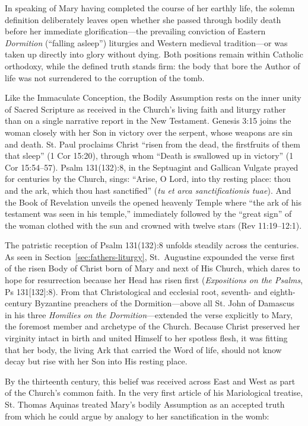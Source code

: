 In speaking of Mary having completed the course of her earthly life, the solemn definition deliberately leaves open whether she passed through bodily death before her immediate glorification---the prevailing conviction of Eastern \textit{Dormition} (``falling asleep'') liturgies and Western medieval tradition---or was taken up directly into glory without dying. Both positions remain within Catholic orthodoxy, while the defined truth stands firm: the body that bore the Author of life was not surrendered to the corruption of the tomb.

Like the Immaculate Conception, the Bodily Assumption rests on the inner unity of Sacred Scripture as received in the Church's living faith and liturgy rather than on a single narrative report in the New Testament. Genesis 3:15 joins the woman closely with her Son in victory over the serpent, whose weapons are sin and death. St. Paul proclaims Christ ``risen from the dead, the firstfruits of them that sleep'' (1 Cor 15:20), through whom ``Death is swallowed up in victory'' (1 Cor 15:54--57). Psalm 131(132):8, in the Septuagint and Gallican Vulgate prayed for centuries by the Church, sings: ``Arise, O Lord, into thy resting place: thou and the ark, which thou hast sanctified'' (\textit{tu et arca sanctificationis tuae}). And the Book of Revelation unveils the opened heavenly Temple where ``the ark of his testament was seen in his temple,'' immediately followed by the ``great sign'' of the woman clothed with the sun and crowned with twelve stars (Rev 11:19--12:1).

The patristic reception of Psalm 131(132):8 unfolds steadily across the centuries. As seen in Section~\ref{sec:fathers-liturgy}, St.\ Augustine expounded the verse first of the risen Body of Christ born of Mary and next of His Church, which dares to hope for resurrection because her Head has risen first (\textit{Expositions on the Psalms}, Ps 131[132]:8). From that Christological and ecclesial root, seventh- and eighth-century Byzantine preachers of the Dormition---above all St. John of Damascus in his three \textit{Homilies on the Dormition}---extended the verse explicitly to Mary, the foremost member and archetype of the Church. Because Christ preserved her virginity intact in birth and united Himself to her spotless flesh, it was fitting that her body, the living Ark that carried the Word of life, should not know decay but rise with her Son into His resting place.

By the thirteenth century, this belief was received across East and West as part of the Church's common faith. In the very first article of his Mariological treatise, St. Thomas Aquinas treated Mary's bodily Assumption as an accepted truth from which he could argue by analogy to her sanctification in the womb:

